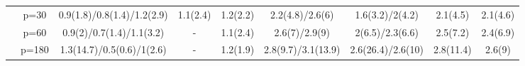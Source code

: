 \begin{table}[ht]
{\begin{tabular}{|c|c|ccccccc|}
   & p=30 & 0.9(1.8)/0.8(1.4)/1.2(2.9) & 1.1(2.4) & 1.2(2.2) & 2.2(4.8)/2.6(6) & 1.6(3.2)/2(4.2) & 2.1(4.5) & 2.1(4.6) \\ 
   & p=60 & 0.9(2)/0.7(1.4)/1.1(3.2) & - & 1.1(2.4) & 2.6(7)/2.9(9) & 2(6.5)/2.3(6.6) & 2.5(7.2) & 2.4(6.9) \\ 
   & p=180 & 1.3(14.7)/0.5(0.6)/1(2.6) & - & 1.2(1.9) & 2.8(9.7)/3.1(13.9) & 2.6(26.4)/2.6(10) & 2.8(11.4) & 2.6(9) \\ 
   \bottomrule 
\end{tabular}
}
\end{table}

